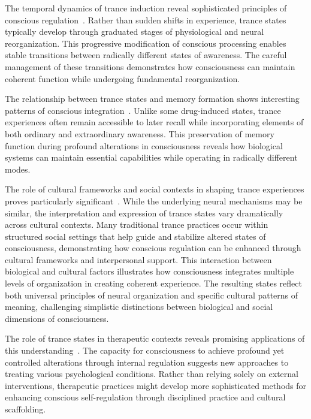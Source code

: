 The temporal dynamics of trance induction reveal sophisticated principles of conscious regulation~\cite{Turner1992, pinotsis2023vivo}. Rather than sudden shifts in experience, trance states typically develop through graduated stages of physiological and neural reorganization. This progressive modification of conscious processing enables stable transitions between radically different states of awareness. The careful management of these transitions demonstrates how consciousness can maintain coherent function while undergoing fundamental reorganization.

The relationship between trance states and memory formation shows interesting patterns of conscious integration~\cite{Jilek1982, kukushkin2024massed}. Unlike some drug-induced states, trance experiences often remain accessible to later recall while incorporating elements of both ordinary and extraordinary awareness. This preservation of memory function during profound alterations in consciousness reveals how biological systems can maintain essential capabilities while operating in radically different modes.

The role of cultural frameworks and social contexts in shaping trance experiences proves particularly significant~\cite{Lewis2003, butlin2023consciousnessartificialintelligenceinsights, Houseman1998}. While the underlying neural mechanisms may be similar, the interpretation and expression of trance states vary dramatically across cultural contexts. Many traditional trance practices occur within structured social settings that help guide and stabilize altered states of consciousness, demonstrating how conscious regulation can be enhanced through cultural frameworks and interpersonal support. This interaction between biological and cultural factors illustrates how consciousness integrates multiple levels of organization in creating coherent experience. The resulting states reflect both universal principles of neural organization and specific cultural patterns of meaning, challenging simplistic distinctions between biological and social dimensions of consciousness.

The role of trance states in therapeutic contexts reveals promising applications of this understanding~\cite{Crapanzano1973, hunt2024electromagnetic}. The capacity for consciousness to achieve profound yet controlled alterations through internal regulation suggests new approaches to treating various psychological conditions. Rather than relying solely on external interventions, therapeutic practices might develop more sophisticated methods for enhancing conscious self-regulation through disciplined practice and cultural scaffolding.

